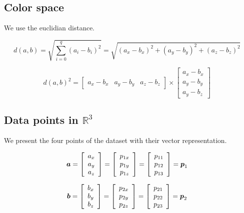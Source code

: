 \documentclass{article}
\newcommand{\bm}[1]{\mbox{\boldmath$#1$}}
\begin{document}
\subsection{Color space}

We use the euclidian distance.

$$
d(a,b) =
\sqrt{\sum_{i=0}^q (a_i - b_i)^2} =
\sqrt{(a_x - b_x)^2 + (a_y - b_y)^2 + (a_z - b_z)^2}
$$

$$
d(a,b)^2 = 
\left[\begin{array}{ccc}
 a_x - b_x & a_y - b_y  & a_z - b_z
\end{array}\right]
\times
\left[\begin{array}{c}
 a_x - b_x \\
 a_y - b_y \\
 a_y - b_z
\end{array}\right]
$$

\subsection{Data points in $\mathbb{R}^3$}
We present the four points of the dataset with their vector representation.

$$
\bm{a} = 
\left[\begin{array}{c}
 a_x \\
 a_y \\
 a_z
\end{array}\right]
=
\left[\begin{array}{c}
 p_{1x} \\
 p_{1y} \\
 p_{1z}
\end{array}\right]
=
\left[\begin{array}{c}
 p_{11} \\
 p_{12} \\
 p_{13}
\end{array}\right]
= \bm{p}_1
$$

$$
\bm{b} = 
\left[\begin{array}{c}
 b_x \\
 b_y \\
 b_z
\end{array}\right]
=
\left[\begin{array}{c}
 p_{2x} \\
 p_{2y} \\
 p_{2z}
\end{array}\right]
=
\left[\begin{array}{c}
 p_{21} \\
 p_{22} \\
 p_{23}
\end{array}\right]
= \bm{p}_2
$$
\end{document}
